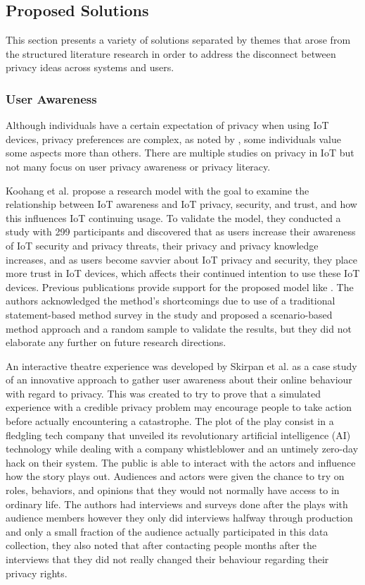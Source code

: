 \subsection{Proposed Solutions}

\par This section presents a variety of solutions separated by themes that arose
from the structured literature research in order to address the disconnect
between privacy ideas across systems and users.

\subsubsection{User Awareness}

Although individuals have a certain expectation of privacy when using IoT
devices, privacy preferences are complex, as noted by \cite{naeini2017privacy},
some individuals value some aspects more than others. There are multiple studies
on privacy in IoT but not many focus on user privacy awareness or
privacy literacy.

Koohang et al. \cite{koohang2022internet} propose a research model with
the goal to examine the relationship between IoT awareness and IoT privacy,
security, and trust, and how this influences IoT continuing usage. To validate
the model, they conducted a study with 299 participants and discovered that
as users increase their awareness of IoT security and privacy threats, their
privacy and privacy knowledge increases, and as users become savvier about
IoT privacy and security, they place more trust in IoT devices, which affects
their continued intention to use these IoT devices. Previous publications
provide support for the proposed model like \cite{tsourela2020internet, knijnenburg2022modern}.
The authors acknowledged the method's shortcomings due to use of a traditional
statement-based method survey in the study and proposed a scenario-based
method approach and a random sample to validate the results, but they did
not elaborate any further on future research directions.

An interactive theatre experience was developed by Skirpan et al. \cite{SkirpanPrivacy}
as a case study of an innovative approach to gather user awareness about their
online behaviour with regard to privacy. This was created to try to prove
that a simulated experience with a credible privacy problem may encourage
people to take action before actually encountering a catastrophe. The plot
of the play consist in a fledgling tech company that unveiled its revolutionary
artificial intelligence (AI) technology while dealing with a company whistleblower and an untimely
zero-day hack on their system. The public is able to interact with the actors
and influence how the story plays out. Audiences and actors were given the
chance to try on roles, behaviors, and opinions that they would not normally
have access to in ordinary life. The authors had interviews and surveys
done after the plays with audience members however they only did interviews
halfway through production and only a small fraction of the audience actually
participated in this data collection, they also noted that after contacting
people months after the interviews that they did not really changed their
behaviour regarding their privacy rights.

